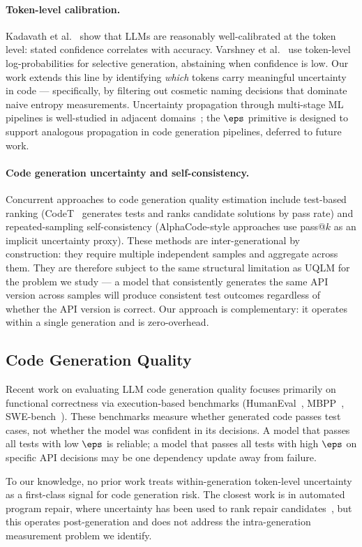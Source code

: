 \paragraph{Token-level calibration.}
Kadavath et al.~\cite{kadavath2022language} show that LLMs are reasonably
well-calibrated at the token level: stated confidence correlates with accuracy.
Varshney et al.~\cite{varshney2023stitch} use token-level log-probabilities
for selective generation, abstaining when confidence is low. Our work extends
this line by identifying \emph{which} tokens carry meaningful uncertainty in
code --- specifically, by filtering out cosmetic naming decisions that dominate
naive entropy measurements. Uncertainty propagation through multi-stage ML
pipelines is well-studied in adjacent domains~\cite{jungo2020analyzing}; the
$\eps$ primitive is designed to support analogous propagation in code
generation pipelines, deferred to future work.

\paragraph{Code generation uncertainty and self-consistency.}
Concurrent approaches to code generation quality estimation include
test-based ranking (CodeT~\cite{chen2022codet} generates tests and ranks
candidate solutions by pass rate) and repeated-sampling self-consistency
(AlphaCode-style approaches use pass@$k$ as an implicit uncertainty proxy).
These methods are inter-generational by construction: they require multiple
independent samples and aggregate across them. They are therefore subject to
the same structural limitation as UQLM for the problem we study --- a model
that consistently generates the same API version across samples will produce
consistent test outcomes regardless of whether the API version is correct.
Our approach is complementary: it operates within a single generation and is
zero-overhead.

\subsection{Code Generation Quality}

Recent work on evaluating LLM code generation quality focuses primarily on
functional correctness via execution-based benchmarks (HumanEval~\cite{chen2021evaluating},
MBPP~\cite{austin2021program}, SWE-bench~\cite{jimenez2024swebench}). These
benchmarks measure whether generated code passes test cases, not whether the
model was confident in its decisions. A model that passes all tests with low
$\eps$ is reliable; a model that passes all tests with high $\eps$ on specific
API decisions may be one dependency update away from failure.

To our knowledge, no prior work treats within-generation token-level
uncertainty as a first-class signal for code generation risk. The closest work
is in automated program repair, where uncertainty has been used to rank repair
candidates~\cite{ye2022selfapr}, but this operates post-generation and does
not address the intra-generation measurement problem we identify.
